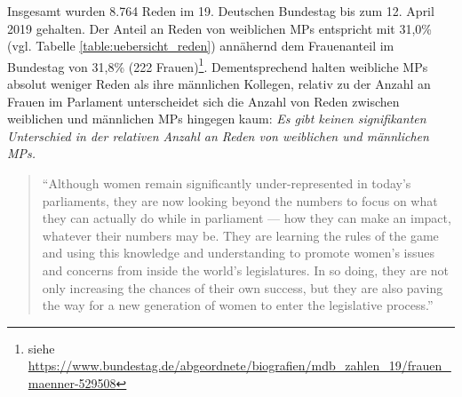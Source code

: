 \documentclass[12pt, 
    twoside=false, 
    bibliography=totoc, 
    numbers=endperiod, 
    headings=normal, 
    toc=chapterentrydotfill
    ]{scrbook}
\begin{document}
Insgesamt wurden 8.764 Reden im 19. Deutschen Bundestag bis zum 12. April 2019 gehalten.  Der Anteil an Reden von weiblichen MPs entspricht mit 31,0\% (vgl. Tabelle \ref{table:uebersicht_reden}) annähernd dem Frauenanteil im Bundestag von 31,8\% (222 Frauen)\footnote{siehe \url{https://www.bundestag.de/abgeordnete/biografien/mdb_zahlen_19/frauen_maenner-529508}}. Dementsprechend halten weibliche MPs absolut weniger Reden als ihre männlichen Kollegen, relativ zu der Anzahl an Frauen im Parlament unterscheidet sich die Anzahl von Reden zwischen weiblichen und männlichen MPs hingegen kaum: \emph{Es gibt keinen signifikanten Unterschied in der relativen Anzahl an Reden von weiblichen und männlichen MPs.}











\begin{quote}
    \enquote{Although women remain significantly under-represented in today’s parliaments, they are now looking beyond the numbers to focus on what they can actually do while in parliament — how they can make an impact, whatever their numbers may be. They are learning the rules of the game and using this knowledge and understanding to promote women’s issues and concerns from inside the world’s legislatures. In so doing, they are not only increasing the chances of their own success, but they are also paving the way for a new generation of women to enter the legislative process.} \parencite[3]{lovenduski_2015}
\end{quote}
\end{document}
